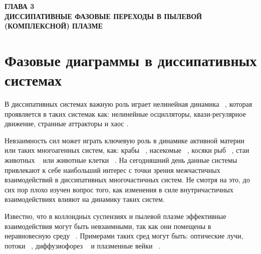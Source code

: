 \newpage
\begin{center}
\textbf{ГЛАВА 3}\\
\textbf{ДИССИПАТИВНЫЕ ФАЗОВЫЕ ПЕРЕХОДЫ В ПЫЛЕВОЙ (КОМПЛЕКСНОЙ) ПЛАЗМЕ}
\end{center}



\section{Фазовые диаграммы в диссипативных системах}

В диссипативных системах важную роль играет нелинейная динамика ~\cite{Lichtenberg}, которая проявляется в таких системак как: нелинейные осцилляторы, квази-регулярное движение, странные аттракторы и хаос \cite{physrep.2005, Rabinovich2006, Ernest2015}.

Невзаимность сил может играть ключевую роль в динамике активной материи ~\cite{Vicsek2012} или таких многоагенных систем, как: крабы ~\cite{Yukio2018}, насекомые ~\cite{Sumpter2006}, косяки рыб ~\cite{Katz2013}, стаи животных ~\cite{Francesco2015} или животные клетки ~\cite{Copenhagen2018}. На сегодняшний день данные системы привлекают к себе наибольший интерес с точки зрения межчастичных взаимодействий в диссипативных многочастичных систем. Не смотря на это, до сих пор плохо изучен вопрос того, как изменения в силе внутричастичных взаимодействиях влияют на динамику таких систем. 

Известно, что в коллоидных суспензиях и пылевой плазме эффективные взаимодействия могут быть невзаимными, так как они помещены в неравновесную среду ~\cite{Royall2015, 10.1103/PhysRevX.5.011035}. Примерами таких сред могут быть: оптические лучи, потоки ~\cite{PhysRevLett.91.248301,Hayashi2006, Sriram2012, Carlos2011}, диффузиофорез ~\cite{PhysRevLett.105.218103, Hassan2017, Huan2016} и 
плазменные вейки ~\cite{10.1070/pu1997v040n01abeh000201, 10.1103/physreve.64.046403, 10.1039/c0sm00813c, 10.1103/physreve.54.4155, 10.1103/physreve.53.2757, 10.1103/physreve.93.063201, 10.1209/0295-5075/111/50003, 10.1063/1.4953225}. 


